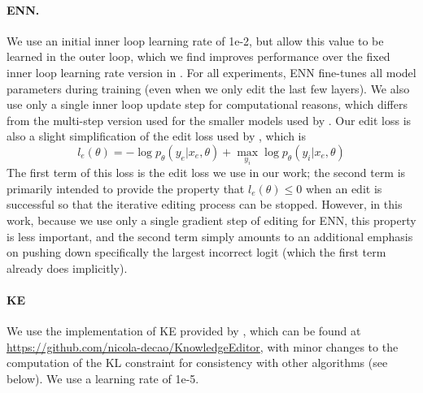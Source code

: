 \documentclass{article}
\begin{document}
\begin{appendix}
\paragraph{ENN.} We use an initial inner loop learning rate of 1e-2, but allow this value to be learned in the outer loop, which we find improves performance over the fixed inner loop learning rate version in \cite{Sinitsin2020Editable}. For all experiments, ENN fine-tunes all model parameters during training (even when we only edit the last few layers). We also use only a single inner loop update step for computational reasons, which differs from the multi-step version used for the smaller models used by \cite{Sinitsin2020Editable}. Our edit loss is also a slight simplification of the edit loss used by \cite{Sinitsin2020Editable}, which is
\begin{equation}
    l_e(\theta) = - \log p_\theta(y_e|x_e,\theta) + \max_{y_i} \log p_\theta(y_i|x_e, \theta) 
\end{equation}
The first term of this loss is the edit loss we use in our work; the second term is primarily intended to provide the property that $l_e(\theta) \le 0$ when an edit is successful so that the iterative editing process can be stopped. However, in this work, because we use only a single gradient step of editing for ENN, this property is less important, and the second term simply amounts to an additional emphasis on pushing down specifically the largest incorrect logit (which the first term already does implicitly).

\paragraph{KE} We use the implementation of KE provided by \cite{Cao2021EditingFK}, which can be found at \href{https://github.com/nicola-decao/KnowledgeEditor}{https://github.com/nicola-decao/KnowledgeEditor}, with minor changes to the computation of the KL constraint for consistency with other algorithms (see below). We use a learning rate of 1e-5.


\end{appendix}
\end{document}
